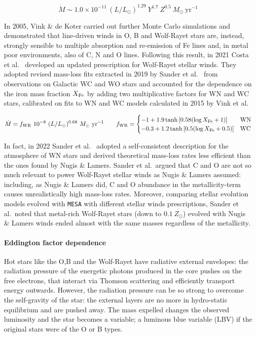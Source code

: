 \documentclass[a4paper,titlepage]{book}     	%
\newcommand{\sun}{\ensuremath{_\odot}}
\newcommand{\mdot}{\ensuremath{\dot{M}}}
\newcommand{\msun}{\ensuremath{M\sun}}
\newcommand{\zsun}{\ensuremath{Z\sun}}
\newcommand{\yr}{\text{yr}}
\begin{document}
\begin{equation}\label{eq:NugisLamers2000}
	\mdot \sim 1.0 \times 10^{-11}~(L/L_\odot)^{1.29}~Y^{1.7}~Z^{0.5}~\msun~\yr^{-1}
\end{equation}


In 2005, Vink \& de Koter \cite{VinkDeKoter2005_stellarwindsFe} carried out further Monte Carlo simulations and demonstrated that line-driven winds in O, B and Wolf-Rayet stars are, instead, strongly sensible to multiple absorption and re-emission of Fe lines and, in metal poor environments, also of C, N and O lines. Following this result, in 2021 Costa et al.\ \cite{MassGapStellarEvo_Costa2021} developed an updated prescription for Wolf-Rayet stellar winds. They adopted revised mass-loss fits extracted in 2019 by Sander et al.\ \cite{Sander2019_WRwinds} from observations on Galactic WC and WO stars and accounted for the dependence on the iron mass fraction $X_{\rm Fe}$ by adding two multiplicative factors for WN and WC stars, calibrated on fits to WN and WC models calculated in 2015 by Vink et al.\ \cite{Vink2015_stellarwindsFe}

\begin{equation}\label{eq:Costa2021Sander2019}
    \mdot = f_{\rm WR}~ 10^{-8} ~ (L/L_\odot)^{0.68} ~\msun~\yr^{-1} \quad \quad f_{\rm WR} = 
\begin{cases}
-1 + 1.9 \tanh{[0.58 (\log X_{\rm Fe} +1)]} & \text{WN} \\
-0.3 + 1.2 \tanh{[0.5 (\log X_{\rm Fe} +0.5)]} & \text{WC}
\end{cases}
\end{equation}

In fact, in 2022 Sander et al.\ \cite{Sander2022_WRwindsupdate} adopted a self-consistent description for the atmosphere of WN stars and derived theoretical mass-loss rates less efficient than the ones found by Nugis \& Lamers. Sander et al.\ argued that C and O are not so much relevant to power Wolf-Rayet stellar winds as Nugis \& Lamers assumed: including, as Nugis \& Lamers did, C and O abundance in the metallicity-term causes unrealistically high mass-loss rates. Moreover, comparing stellar evolution models evolved with \texttt{MESA} with different stellar winds prescriptions, Sander et al.\ noted that metal-rich Wolf-Rayet stars (down to $0.1 ~\zsun$) evolved with Nugis \& Lamers winds ended almost with the same masses regardless of the metallicity.

\paragraph{Eddington factor dependence}
Hot stars like the O,B and the Wolf-Rayet have radiative external envelopes: the radiation pressure of the energetic photons produced in the core pushes on the free electrons, that interact via Thomson scattering and efficiently transport energy outwards. However, the radiation pressure can be so strong to overcome the self-gravity of the star: the external layers are no more in hydro-static equilibrium and are pushed away. The mass expelled changes the observed luminosity and the star becomes a variable; a luminous blue variable (LBV) if the original stars were of the O or B types.
\end{document}
